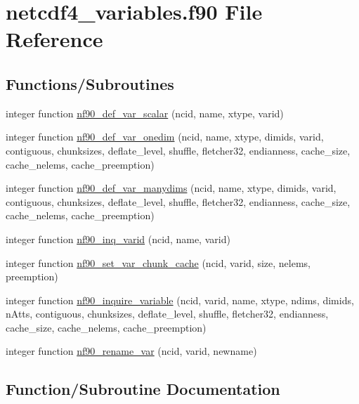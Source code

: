 \hypertarget{netcdf4__variables_8f90}{}\section{netcdf4\+\_\+variables.\+f90 File Reference}
\label{netcdf4__variables_8f90}
\subsection*{Functions/\+Subroutines}
\begin{DoxyCompactItemize}
\item 
integer function \hyperlink{netcdf4__variables_8f90_ab4e65fef4873720b23fc10d39d167def}{nf90\+\_\+def\+\_\+var\+\_\+scalar} (ncid, name, xtype, varid)
\item 
integer function \hyperlink{netcdf4__variables_8f90_aa7b97046fe9b36f359781ddb7f6ea5c7}{nf90\+\_\+def\+\_\+var\+\_\+onedim} (ncid, name, xtype, dimids, varid, contiguous, chunksizes, deflate\+\_\+level, shuffle, fletcher32, endianness, cache\+\_\+size, cache\+\_\+nelems, cache\+\_\+preemption)
\item 
integer function \hyperlink{netcdf4__variables_8f90_ad5483fb35ddc06477ba6c9160944a14f}{nf90\+\_\+def\+\_\+var\+\_\+manydims} (ncid, name, xtype, dimids, varid, contiguous, chunksizes, deflate\+\_\+level, shuffle, fletcher32, endianness, cache\+\_\+size, cache\+\_\+nelems, cache\+\_\+preemption)
\item 
integer function \hyperlink{netcdf4__variables_8f90_ad13ff0a76f836cb953fb402637edca20}{nf90\+\_\+inq\+\_\+varid} (ncid, name, varid)
\item 
integer function \hyperlink{netcdf4__variables_8f90_a90ad028a51b07010140805455e456d31}{nf90\+\_\+set\+\_\+var\+\_\+chunk\+\_\+cache} (ncid, varid, size, nelems, preemption)
\item 
integer function \hyperlink{netcdf4__variables_8f90_a799c6c4419388a7a6317d7661499fa0e}{nf90\+\_\+inquire\+\_\+variable} (ncid, varid, name, xtype, ndims, dimids, n\+Atts, contiguous, chunksizes, deflate\+\_\+level, shuffle, fletcher32, endianness, cache\+\_\+size, cache\+\_\+nelems, cache\+\_\+preemption)
\item 
integer function \hyperlink{netcdf4__variables_8f90_aa3779419b3894a821cca28e761077b2c}{nf90\+\_\+rename\+\_\+var} (ncid, varid, newname)
\end{DoxyCompactItemize}


\subsection{Function/\+Subroutine Documentation}
\mbox{\label{netcdf4__variables_8f90_ad5483fb35ddc06477ba6c9160944a14f}} 
